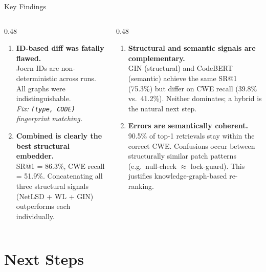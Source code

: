 \documentclass[aspectratio=169,10pt]{beamer}
\begin{document}
\begin{frame}{Key Findings}
\begin{columns}[T]
\begin{column}{0.48\textwidth}
  \begin{enumerate}
    \item[\faIcon{bug}] \textbf{ID-based diff was fatally flawed.}\\
      Joern IDs are non-deterministic across runs.
      All graphs were indistinguishable.\\
      \textit{Fix: \texttt{(type, CODE)} fingerprint matching.}

    \vspace{0.7em}
    \item[\faIcon{layer-group}] \textbf{Combined is clearly the best structural embedder.}\\
      SR@1 = 86.3\%, CWE recall = 51.9\%.
      Concatenating all three structural signals (NetLSD + WL + GIN)
      outperforms each individually.

  \end{enumerate}
\end{column}
\begin{column}{0.48\textwidth}
  \begin{enumerate}
    \item[\faIcon{code}] \textbf{Structural and semantic signals are complementary.}\\
      GIN (structural) and CodeBERT (semantic) achieve the same SR@1 (75.3\%)
      but differ on CWE recall (39.8\% vs.\ 41.2\%).
      Neither dominates; a hybrid is the natural next step.

    \vspace{0.7em}
    \item[\faIcon{project-diagram}] \textbf{Errors are semantically coherent.}\\
      90.5\% of top-1 retrievals stay within the correct CWE.
      Confusions occur between structurally similar patch patterns
      (e.g.\ null-check $\approx$ lock-guard).
      This justifies knowledge-graph-based re-ranking.
  \end{enumerate}
\end{column}
\end{columns}
\end{frame}

\section{Next Steps}
\end{document}
